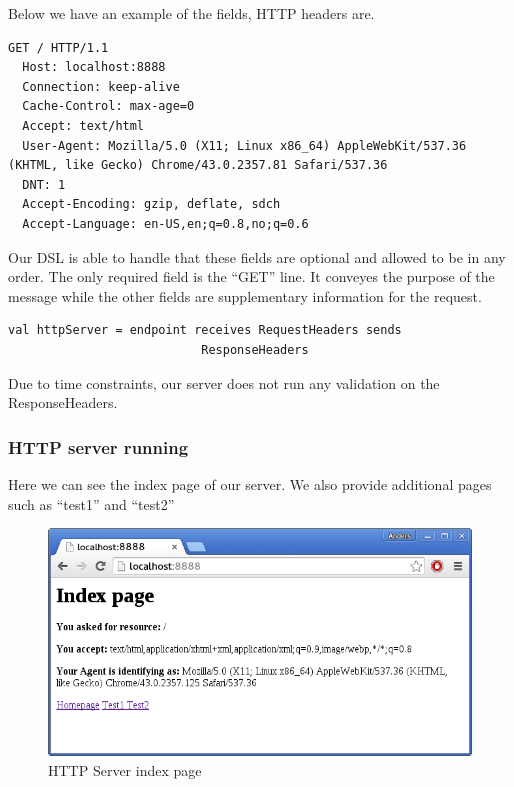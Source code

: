 Below we have an example of the fields, HTTP headers are.
\begin{lstlisting}[style=myScalastyle]
  GET / HTTP/1.1
  Host: localhost:8888
  Connection: keep-alive
  Cache-Control: max-age=0
  Accept: text/html
  User-Agent: Mozilla/5.0 (X11; Linux x86_64) AppleWebKit/537.36 (KHTML, like Gecko) Chrome/43.0.2357.81 Safari/537.36
  DNT: 1
  Accept-Encoding: gzip, deflate, sdch
  Accept-Language: en-US,en;q=0.8,no;q=0.6
\end{lstlisting}
Our DSL is able to handle that these fields are optional and allowed to be in any order. The only required field is the ``GET'' line. It conveyes the purpose of the message while the other fields are supplementary information for the request.
\begin{lstlisting}[style=myScalastyle]
val httpServer = endpoint receives RequestHeaders sends 
                           ResponseHeaders 
\end{lstlisting}
Due to time constraints, our server does not run any validation on the ResponseHeaders.
\subsubsection{HTTP server running}
Here we can see the index page of our server. We also provide additional pages such as ``test1'' and ``test2''
\begin{figure}[h]
	\centering
	\includegraphics[scale=0.7]{images/protocolimplementations/httpserver.png} 
	\caption{HTTP Server index page}
	\label{fig:httpserver}
\end{figure}











